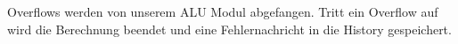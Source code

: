 Overflows werden von unserem ALU Modul abgefangen. Tritt ein Overflow auf wird die Berechnung beendet und eine Fehlernachricht in die History gespeichert.